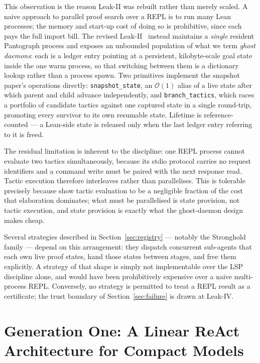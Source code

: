 \documentclass[12pt, a4paper]{article}
\begin{document}
This observation is the reason Leak-II was rebuilt rather than merely
scaled. A naive approach to parallel proof search over a REPL is to run many
Lean processes; the memory and start-up cost of doing so is prohibitive,
since each pays the full import bill. The revised
Leak-II~\cite{leakii2026upgrade} instead maintains a \emph{single} resident
Pantograph process and exposes an unbounded population of what we term
\emph{ghost daemons}: each is a ledger entry pointing at a persistent,
kilobyte-scale goal state inside the one warm process, so that switching
between them is a dictionary lookup rather than a process spawn. Two
primitives implement the snapshot paper's operations directly:
\texttt{snapshot\_state}, an $\mathcal{O}(1)$ alias of a live state after
which parent and child advance independently, and
\texttt{branch\_tactics}, which races a portfolio of candidate tactics
against one captured state in a single round-trip, promoting every survivor
to its own resumable state. Lifetime is reference-counted --- a Lean-side
state is released only when the last ledger entry referring to it is freed.

The residual limitation is inherent to the discipline: one REPL process
cannot evaluate two tactics simultaneously, because its stdio protocol
carries no request identifiers and a command write must be paired with the
next response read. Tactic execution therefore interleaves rather than
parallelises. This is tolerable precisely because
\textcite{shen2026snapshot} show tactic evaluation to be a negligible
fraction of the cost that elaboration dominates; what must be parallelised
is state provision, not tactic execution, and state provision is exactly
what the ghost-daemon design makes cheap.

Several strategies described in Section~\ref{sec:registry} --- notably the
Stronghold family --- depend on this arrangement: they dispatch concurrent
sub-agents that each own live proof states, hand those states between
stages, and free them explicitly. A strategy of that shape is simply not
implementable over the LSP discipline alone, and would have been
prohibitively expensive over a naive multi-process REPL. Conversely, no
strategy is permitted to treat a REPL result as a certificate; the trust
boundary of Section~\ref{sec:failure} is drawn at Leak-IV.

\section{Generation One: A Linear ReAct Architecture for Compact Models}
\label{sec:gen1-arch}
\end{document}
